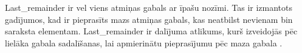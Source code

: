 Last\_remainder ir vel viens atmiņas gabals ar īpašu nozīmi.
Tas ir izmantots gadījumos, kad ir pieprasīts mazs atmiņas gabals, kas neatbilst nevienam bin saraksta elementam. 
Last\_remainder ir dalījuma atlikums, kurš izveidojās pēc lielāka gabala sadalīšanas, lai apmierinātu pieprasījumu pēc maza gabala  \cite {BLACKHAT}.








